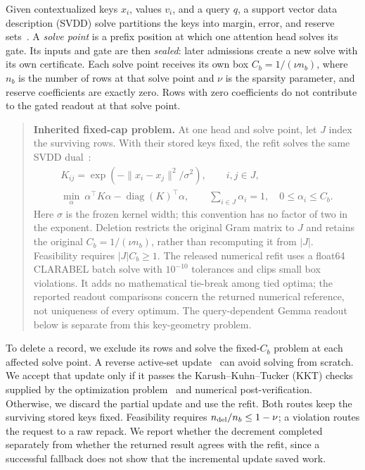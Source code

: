 Given contextualized keys \(x_i\), values \(v_i\), and a query \(q\), a
support vector data description (SVDD) solve partitions the keys into margin, error, and
reserve sets~\citep{svdd}. A \emph{solve point} is a prefix position at which one attention head solves
its gate. Its inputs and gate are then \emph{sealed}: later admissions create
a new solve with its own certificate. Each solve point receives its own box
\(C_b=1/(\nu n_b)\), where \(n_b\) is the number of rows at that solve point and
\(\nu\) is the sparsity parameter, and reserve coefficients are exactly zero.
Rows with zero coefficients do not contribute to the gated readout at that
solve point.


\begin{quote}
\normalsize
\begin{minipage}{\linewidth}
\textbf{Inherited fixed-cap problem.}
At one head and solve point, let \(J\) index the surviving rows. With their
stored keys fixed, the refit solves the same SVDD dual~\citep{svdd,svattn}:
\[
\begin{gathered}
K_{ij}=\exp\!\left(-\|x_i-x_j\|^2/\sigma^2\right),\qquad i,j\in J,\\
\min_{\alpha}\ \alpha^\top K\alpha-\operatorname{diag}(K)^\top\alpha,
\qquad \sum_{i\in J}\alpha_i=1,\quad 0\leq\alpha_i\leq C_b.
\end{gathered}
\]
Here \(\sigma\) is the frozen kernel width; this convention has no factor of
two in the exponent. Deletion restricts the original Gram matrix to \(J\)
and retains the original \(C_b=1/(\nu n_b)\), rather than recomputing it from
\(|J|\). Feasibility requires \(|J|C_b\geq1\). The released numerical refit
uses a float64 CLARABEL batch solve with \(10^{-10}\) tolerances and clips
small box violations. It adds no mathematical tie-break among tied optima;
the reported readout comparisons concern the returned numerical reference,
not uniqueness of every optimum. The query-dependent Gemma readout below is
separate from this key-geometry problem.
\end{minipage}
\end{quote}

To delete a record, we exclude its rows and solve the fixed-\(C_b\) problem
at each affected solve point. A reverse active-set update~\citep{cp2000}
can avoid solving from scratch. We accept that update only if it passes
the Karush--Kuhn--Tucker (KKT) checks supplied by the
optimization problem~\citep{svdd,svattn} and numerical post-verification.
Otherwise, we discard the partial update and use the refit. Both routes
keep the surviving stored keys fixed. Feasibility requires
\(n_{\rm del}/n_b\le1-\nu\); a violation routes the request to a raw repack.
We report whether the decrement completed separately from whether the
returned result agrees with the refit, since a successful fallback does not
show that the incremental update saved work.


